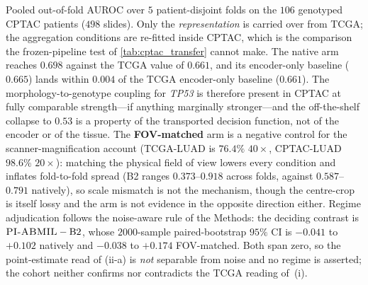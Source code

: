 \begin{flushleft}\footnotesize
Pooled out-of-fold AUROC over $5$ patient-disjoint folds on the $106$
genotyped CPTAC patients ($498$ slides). Only the \emph{representation} is
carried over from TCGA; the aggregation conditions are re-fitted inside CPTAC,
which is the comparison the frozen-pipeline test of \cref{tab:cptac_transfer}
cannot make. The native arm reaches $0.698$ against the TCGA value of $0.661$,
and its encoder-only baseline ($0.665$) lands within $0.004$ of the TCGA
encoder-only baseline ($0.661$). The morphology-to-genotype coupling for
\textit{TP53} is therefore present in CPTAC at fully comparable strength---if
anything marginally stronger---and the off-the-shelf collapse to $0.53$ is a
property of the transported decision function, not of the encoder or of the
tissue.
The \textbf{FOV-matched} arm is a negative control for the
scanner-magnification account (TCGA-LUAD is $76.4\%$ $40\times$, CPTAC-LUAD
$98.6\%$ $20\times$): matching the physical field of view lowers every
condition and inflates fold-to-fold spread (B2 ranges $0.373$--$0.918$ across
folds, against $0.587$--$0.791$ natively), so scale mismatch is not the
mechanism, though the centre-crop is itself lossy and the arm is not evidence
in the opposite direction either.
Regime adjudication follows the noise-aware rule of the Methods: the deciding
contrast is $\textsc{PI-ABMIL}{}-\mathrm{B2}$, whose $2000$-sample paired-bootstrap
$95\%$ CI is $-0.041$ to $+0.102$ natively and $-0.038$ to $+0.174$
FOV-matched. Both span zero, so the point-estimate read of (ii-a) is
\emph{not} separable from noise and no regime is asserted; the cohort neither
confirms nor contradicts the TCGA reading of~(i).
\end{flushleft}
